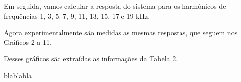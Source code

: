 
Em seguida, vamos calcular a resposta do sistema para os harmônicos de frequências 1, 3, 5, 7, 9, 11, 13, 15, 17 e 19 kHz.


Agora experimentalmente são medidas as mesmas respostas, que seguem nos Gráficos 2 a 11. 



Desses gráficos são extraídas as informações da Tabela 2.
\newpage



blablabla